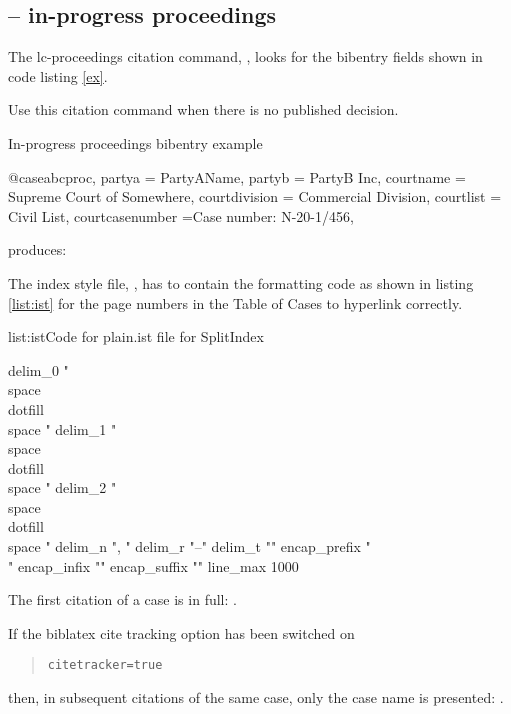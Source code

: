 \subsection{ -- in-progress proceedings}
The lc-proceedings citation command, , looks for the bibentry fields shown in code listing \ref{ex}.

Use this citation command when there is no published decision.

\begin{dov}{ex}{In-progress proceedings bibentry example}

@case{abcproc,
  partya = {PartyAName},
  partyb = {PartyB Inc},
  courtname = {Supreme Court of Somewhere},
  courtdivision = {Commercial Division},
  courtlist = {Civil List},
  courtcasenumber ={Case number: N-20-1/456},
}

\end{dov}

 produces: 

\bigskip

The index style file, , has to contain the formatting code as shown in listing \ref{list:ist} for the page numbers in the Table of Cases to hyperlink correctly.


\begin{dov}{list:ist}{Code for plain.ist file for SplitIndex}

delim_0 "\\space\\dotfill\\space "\hss
delim_1 "\\space\\dotfill\\space "\hss
delim_2 "\\space\\dotfill\\space "\hss
delim_n ", "
delim_r "--"
delim_t ""
encap_prefix "\\"
encap_infix "{"
encap_suffix "}"
line_max 1000

\end{dov}
\newpage
The first citation of a case is in full: .

If the biblatex cite tracking option has been switched on 
\begin{quotation}
\hspace{2em}\verb|citetracker=true|
\end{quotation}
 then, in subsequent citations of the same case, only the case name is presented: .

